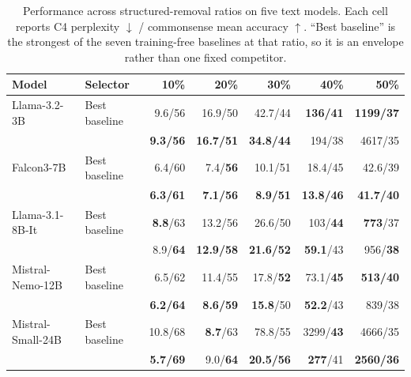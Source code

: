 \begin{table}[tbp]
\centering\singlespacing\scriptsize
\caption{Performance across structured-removal ratios on five text models. Each cell reports C4 perplexity $\downarrow$ / commonsense mean accuracy $\uparrow$. ``Best baseline'' is the strongest of the seven training-free baselines at that ratio, so it is an envelope rather than one fixed competitor.}
\label{tab:cc-ratio-sweep}
\setlength{\tabcolsep}{4.0pt}\renewcommand{\arraystretch}{1.04}
\begin{tabular}{llrrrrr}
\toprule
\textbf{Model} & \textbf{Selector} & \textbf{10\%} & \textbf{20\%} & \textbf{30\%} & \textbf{40\%} & \textbf{50\%}\\
\midrule
Llama-3.2-3B & Best baseline & 9.6/56 & 16.9/50 & 42.7/44 & \textbf{136/41} & \textbf{1199/37}\\
\rowcolor{SoftBlue}& \textbf{\CoCurve{}} & \textbf{9.3/56} & \textbf{16.7/51} & \textbf{34.8/44} & 194/38 & 4617/35\\
\addlinespace[1pt]
Falcon3-7B & Best baseline & 6.4/60 & 7.4/\textbf{56} & 10.1/51 & 18.4/45 & 42.6/39\\
\rowcolor{SoftBlue}& \textbf{\CoCurve{}} & \textbf{6.3/61} & \textbf{7.1/56} & \textbf{8.9/51} & \textbf{13.8/46} & \textbf{41.7/40}\\
\addlinespace[1pt]
Llama-3.1-8B-It & Best baseline & \textbf{8.8}/63 & 13.2/56 & 26.6/50 & 103/\textbf{44} & \textbf{773}/37\\
\rowcolor{SoftBlue}& \textbf{\CoCurve{}} & 8.9/\textbf{64} & \textbf{12.9/58} & \textbf{21.6/52} & \textbf{59.1}/43 & 956/\textbf{38}\\
\addlinespace[1pt]
Mistral-Nemo-12B & Best baseline & 6.5/62 & 11.4/55 & 17.8/\textbf{52} & 73.1/\textbf{45} & \textbf{513/40}\\
\rowcolor{SoftBlue}& \textbf{\CoCurve{}} & \textbf{6.2/64} & \textbf{8.6/59} & \textbf{15.8}/50 & \textbf{52.2}/43 & 839/38\\
\addlinespace[1pt]
Mistral-Small-24B & Best baseline & 10.8/68 & \textbf{8.7}/63 & 78.8/55 & 3299/\textbf{43} & 4666/35\\
\rowcolor{SoftBlue}& \textbf{\CoCurve{}} & \textbf{5.7/69} & 9.0/\textbf{64} & \textbf{20.5/56} & \textbf{277}/41 & \textbf{2560/36}\\
\bottomrule
\end{tabular}
\end{table}
